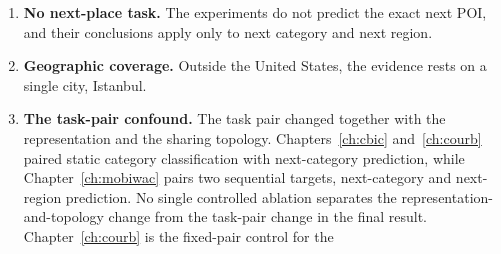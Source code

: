 \begin{enumerate}
    \item \textbf{No next-place task.} The experiments do not predict the exact next
    POI, and their conclusions apply only to next category and next region.
    \item \textbf{Geographic coverage.} Outside the United States, the evidence rests on
    a single city, Istanbul.
    \item \textbf{The task-pair confound.} The task pair changed together with the
    representation and the sharing topology. Chapters~\ref{ch:cbic}
    and~\ref{ch:courb} paired static category classification with next-category
    prediction, while Chapter~\ref{ch:mobiwac} pairs two sequential targets,
    next-category and next-region prediction. No single controlled ablation
    separates the representation-and-topology change from the task-pair change in
    the final result. Chapter~\ref{ch:courb} is the fixed-pair control for the

\end{enumerate}
